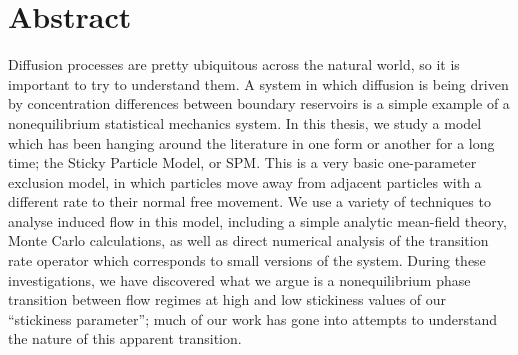 \chapter{Abstract}

Diffusion processes are pretty ubiquitous across the natural world, so it is important to try to understand them. A system in which diffusion is being driven by concentration differences between boundary reservoirs is a simple example of a nonequilibrium statistical mechanics system. In this thesis, we study a model which has been hanging around the literature in one form or another for a long time; the Sticky Particle Model, or SPM. This is a very basic one-parameter exclusion model, in which particles move away from adjacent particles with a different rate to their normal free movement. We use a variety of techniques to analyse induced flow in this model, including a simple analytic mean-field theory, Monte Carlo calculations, as well as direct numerical analysis of the transition rate operator which corresponds to small versions of the system. During these investigations, we have discovered what we argue is a nonequilibrium phase transition between flow regimes at high and low stickiness values of our “stickiness parameter”; much of our work has gone into attempts to understand the nature of this apparent transition.
